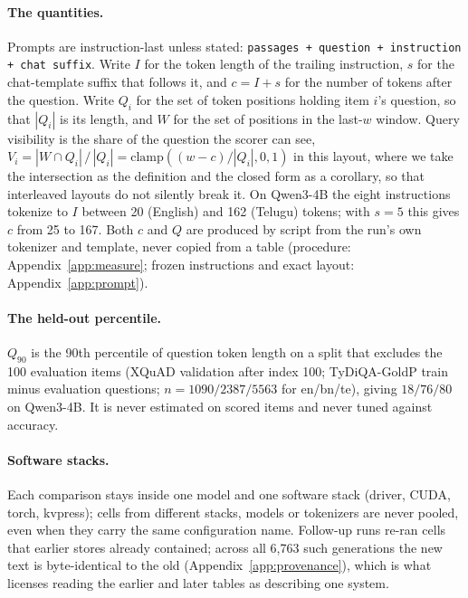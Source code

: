 \documentclass{article}
\begin{document}
\paragraph{The quantities.}
Prompts are instruction-last unless stated:
\texttt{passages + question + instruction + chat suffix}. Write $I$ for
the token length of the trailing instruction, $s$ for the chat-template
suffix that follows it, and $c{=}I{+}s$ for the number of tokens after
the question. Write $Q_i$ for the set of token positions holding item
$i$'s question, so that $|Q_i|$ is its length, and $W$ for the set of
positions in the last-$w$ window. Query visibility is the share of the
question the scorer can see,
$V_i = |W \cap Q_i|\,/\,|Q_i| = \mathrm{clamp}((w-c)/|Q_i|,0,1)$ in
this layout, where we take the intersection as the definition and the
closed form as a corollary, so that interleaved layouts do not silently
break it. On
Qwen3-4B the eight instructions tokenize to $I$ between 20 (English) and
162 (Telugu) tokens; with $s{=}5$ this gives $c$ from 25 to 167. Both $c$ and $Q$ are produced by script
from the run's own tokenizer and template, never copied from a table
(procedure: Appendix~\ref{app:measure}; frozen instructions and exact
layout: Appendix~\ref{app:prompt}).

\paragraph{The held-out percentile.}
$Q_{90}$ is the 90th percentile of question token length on a split that
excludes the 100 evaluation items (XQuAD validation after index 100;
TyDiQA-GoldP train minus evaluation questions; $n{=}1090/2387/5563$
for en/bn/te), giving $18/76/80$ on Qwen3-4B. It is never estimated on
scored items and never tuned against accuracy.

\paragraph{Software stacks.}
Each comparison stays inside one model and one software stack (driver,
CUDA, torch, kvpress); cells from different stacks, models or tokenizers
are never pooled, even when they carry the same configuration name.
Follow-up runs re-ran cells that earlier stores already
contained; across all 6{,}763 such generations the new text is
byte-identical to the old (Appendix~\ref{app:provenance}), which is what
licenses reading the earlier and later tables as describing one system.

\end{document}
